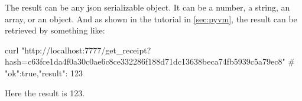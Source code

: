 \documentclass[dvipsnames]{article}
\begin{document}
The result can be any json serializable object. It can be a number, a string, an
array, or an object. And as shown in the tutorial in \cref{sec:pyvm}, the result
can be retrieved by something like:
\begin{simplesh}
curl "http://localhost:7777/get_receipt?hash=c63fce1da4f0a30c0ae6c8ce332286f188d71dc13638beca74fb5939c5a79ec8"
# {"ok":true,"result": 123}
\end{simplesh}
Here the result is 123.
\end{document}
